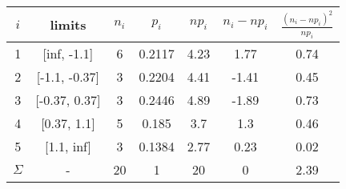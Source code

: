 \begin{tabular}{| c | c | c | c | c | c | c |} \hline
$i$ & limits & $n_i$ & $p_i$ & $np_i$ & $n_i - np_i$ & $\frac{(n_i-np_i)^2}{np_i} $ \\ \hline 
1 & [inf, -1.1] & 6 & 0.2117 & 4.23 & 1.77 & 0.74 \\ \hline 
2 & [-1.1, -0.37] & 3 & 0.2204 & 4.41 & -1.41 & 0.45 \\ \hline 
3 & [-0.37, 0.37] & 3 & 0.2446 & 4.89 & -1.89 & 0.73 \\ \hline 
4 & [0.37, 1.1] & 5 & 0.185 & 3.7 & 1.3 & 0.46 \\ \hline 
5 & [1.1, inf] & 3 & 0.1384 & 2.77 & 0.23 & 0.02 \\ \hline 
$\Sigma$ & - & 20 & 1 & 20 & 0 & 2.39 \\ \hline 
\end{tabular}